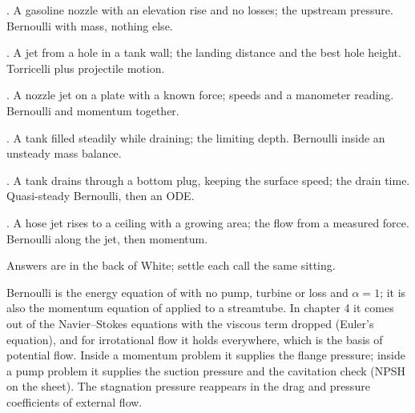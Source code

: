 \begin{ladder}
\item {}. A gasoline nozzle with an elevation rise and no losses; the upstream pressure. Bernoulli with mass, nothing else.
\item {}. A jet from a hole in a tank wall; the landing distance and the best hole height. Torricelli plus projectile motion.
\item {}. A nozzle jet on a plate with a known force; speeds and a manometer reading. Bernoulli and momentum together.
\item {}. A tank filled steadily while draining; the limiting depth. Bernoulli inside an unsteady mass balance.
\item {}. A tank drains through a bottom plug, keeping the surface speed; the drain time. Quasi-steady Bernoulli, then an ODE.
\item {}. A hose jet rises to a ceiling with a growing area; the flow from a measured force. Bernoulli along the jet, then momentum.
\end{ladder}
Answers are in the back of White; settle each call the same sitting.


\begin{hides}
Bernoulli is the energy equation of  with no pump, turbine or loss and $\alpha = 1$; it is also the momentum equation of  applied to a streamtube. In chapter 4 it comes out of the Navier--Stokes equations with the viscous term dropped (Euler's equation), and for irrotational flow it holds everywhere, which is the basis of potential flow. Inside a momentum problem it supplies the flange pressure; inside a pump problem it supplies the suction pressure and the cavitation check (NPSH on the sheet). The stagnation pressure reappears in the drag and pressure coefficients of external flow.
\end{hides}
